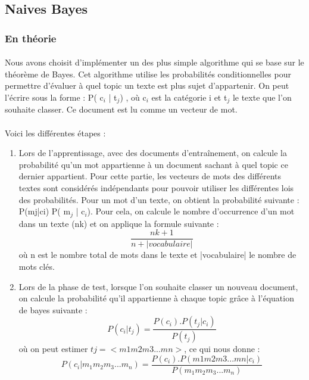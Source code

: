 \subsection{Naives Bayes}

\subsubsection{En théorie}
\paragraph{}
Nous avons choisit d'implémenter un des plus simple algorithme qui se base sur le théorème de Bayes. Cet algorithme utilise les probabilités conditionnelles pour permettre d'évaluer à quel topic un texte est plus sujet d'appartenir. On peut l'écrire sous la forme :  P( c$_{i}$ | t$_{j}$) , où c$_{i}$ est la catégorie i et  t$_{j}$ le texte que l'on souhaite classer. Ce document est lu comme un vecteur de mot. 

\paragraph{}
Voici les différentes étapes : 
\begin{enumerate}
\item Lors de l'apprentissage, avec des documents d’entraînement, on calcule la probabilité qu'un mot appartienne à un document sachant à quel topic ce dernier appartient. Pour cette partie, les vecteurs de mots des différents textes sont considérés indépendants pour pouvoir utiliser les différentes lois des probabilités.
Pour un mot d'un texte, on obtient la probabilité suivante : P(mj|ci) P( m$_{j}$ | c$_{i}$). Pour cela, on calcule le nombre d’occurrence d'un mot dans un texte (nk) et on applique la formule suivante :
\[\frac{ nk +1} {n+|vocabulaire|}\]
 où n est le nombre total de mots dans le texte et |vocabulaire| le nombre de mots clés.

\item Lors de la phase de test, lorsque l'on souhaite classer un nouveau document, on calcule la probabilité qu'il appartienne à chaque topic grâce à l'équation de bayes suivante : 
\[ P( c_{i} | t_{j})= \frac{P(c_{i}).P(t_{j}|c_{i})}{ P(t_{j})}\] 
où on peut estimer $tj=<m1 m2 m3... mn>$, ce qui nous donne : 
\[ P( c_{i} | m_{1} m_{2} m_{3}... m_{n})= \frac{P(c_{i}).P(m1 m2 m3... mn|c_{i})}{ P( m_{1} m_{2} m_{3}... m_{n})}\]
\end{enumerate}
	

